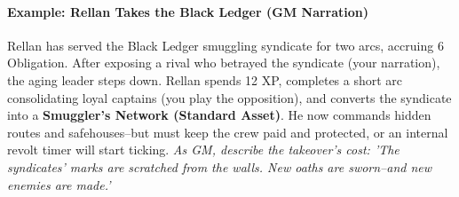 \begin{tcolorbox}[colback=black!3!white,colframe=black!60!white,title=From Faction to Asset/Follower: Taking Over a Terrestrial Patron (GM Guidance),label=sec:takeover-sidebar,breakable]
\paragraph{Example: Rellan Takes the Black Ledger (GM Narration)}
Rellan has served the Black Ledger smuggling syndicate for two arcs, accruing 6 Obligation. After exposing a rival who betrayed the syndicate (your narration), the aging leader steps down. Rellan spends 12 XP, completes a short arc consolidating loyal captains (you play the opposition), and converts the syndicate into a \textbf{Smuggler's Network (Standard Asset)}. He now commands hidden routes and safehouses--but must keep the crew paid and protected, or an internal revolt timer will start ticking.  
\textit{As GM, describe the takeover's cost: 'The syndicates' marks are scratched from the walls. New oaths are sworn--and new enemies are made.'}  
\end{tcolorbox}


